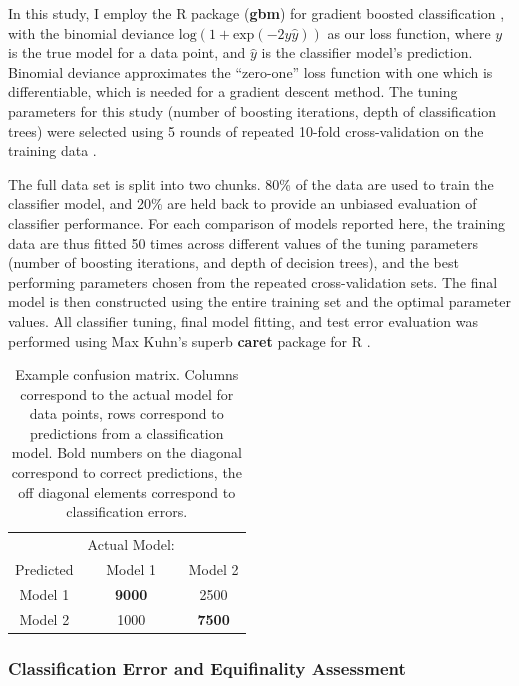 In this study, I employ the R package (\textbf{gbm}) for gradient
boosted classification \cite{ridgeway1999state}, with the binomial deviance \(\textrm{log}(1 + \textrm{exp}(-2y\hat{y}))\) as our loss function, where \(y\) is the true
model for a data point, and \(\hat{y}\) is the classifier model's
prediction.  Binomial deviance approximates the ``zero-one'' loss function with one which is differentiable, which is needed for a gradient descent method.  The tuning parameters for this study (number of boosting iterations, depth of classification trees) were selected using 5 rounds of repeated 10-fold cross-validation on the training data \cite{Kim:2009im, kuhn2013applied}.

The full data set is  split into two chunks. 80\% of the data are
used to train the classifier model, and 20\% are held back to provide an
unbiased evaluation of classifier performance.  For each comparison of models
reported here, the training data are thus fitted 50 times across
different values of the tuning parameters (number of boosting
iterations, and depth of decision trees), and the best performing
parameters chosen from the repeated cross-validation sets. The final model is then constructed using the entire
training set and the optimal parameter values. All classifier tuning,
final model fitting, and test error evaluation was performed using Max
Kuhn's superb \textbf{caret} package for R
\cite{kuhn2008building, kuhn2013applied}.

\begin{table}[ht]
\begin{tabular}{c|cc}
 & Actual Model: & \\
 Predicted &  Model 1 & Model  2 \\
  \hline
 Model  1 & \textbf{9000} & 2500 \\
   Model  2 & 1000 & \textbf{7500} \\
\end{tabular}
    \caption{Example confusion matrix.  Columns correspond to the actual model for data points, rows correspond to predictions from a classification model.  Bold numbers on the diagonal correspond to correct predictions, the off diagonal elements correspond to classification errors.}
    \label{tab:confusion-matrix}
\end{table}


\subsubsection{Classification Error and Equifinality
Assessment}\label{classification-error-and-equifinality-assessment}




